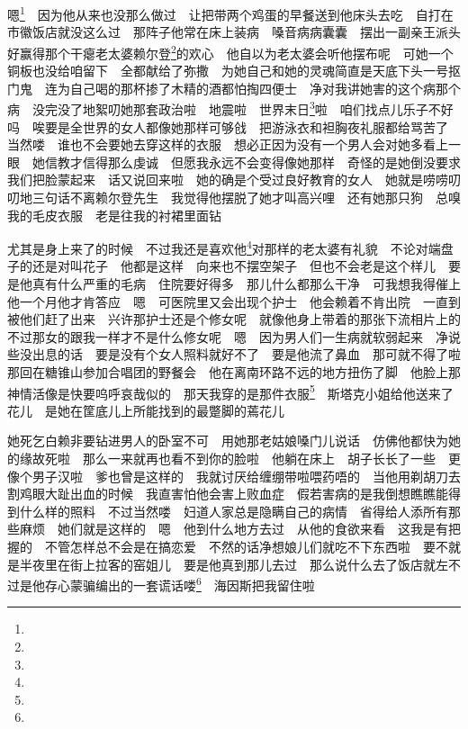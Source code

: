 \par 嗯\footnote{}　因为他从来也没那么做过　让把带两个鸡蛋的早餐送到他床头去吃　自打在市徽饭店就没这么过　那阵子他常在床上装病　嗓音病病囊囊　摆出一副亲王派头　好赢得那个干瘪老太婆赖尔登\footnote{}的欢心　他自以为老太婆会听他摆布呢　可她一个铜板也没给咱留下　全都献给了弥撒　为她自己和她的灵魂简直是天底下头一号抠门鬼　连为自己喝的那杯掺了木精的酒都怕掏四便士　净对我讲她害的这个病那个病　没完没了地絮叨她那套政治啦　地震啦　世界末日\footnote{}啦　咱们找点儿乐子不好吗　唉要是全世界的女人都像她那样可够戗　把游泳衣和袒胸夜礼服都给骂苦了　当然喽　谁也不会要她去穿这样的衣服　想必正因为没有一个男人会对她多看上一眼　她信教才信得那么虔诚　但愿我永远不会变得像她那样　奇怪的是她倒没要求我们把脸蒙起来　话又说回来啦　她的确是个受过良好教育的女人　她就是唠唠叨叨地三句话不离赖尔登先生　我觉得他摆脱了她才叫高兴哩　还有她那只狗　总嗅我的毛皮衣服　老是往我的衬裙里面钻　
\par 尤其是身上来了的时候　不过我还是喜欢他\footnote{}对那样的老太婆有礼貌　不论对端盘子的还是对叫花子　他都是这样　向来也不摆空架子　但也不会老是这个样儿　要是他真有什么严重的毛病　住院要好得多　那儿什么都那么干净　可我想我得催上他一个月他才肯答应　嗯　可医院里又会出现个护士　他会赖着不肯出院　一直到被他们赶了出来　兴许那护士还是个修女呢　就像他身上带着的那张下流相片上的　不过那女的跟我一样才不是什么修女呢　嗯　因为男人们一生病就软弱起来　净说些没出息的话　要是没有个女人照料就好不了　要是他流了鼻血　那可就不得了啦　那回在糖锥山参加合唱团的野餐会　他在离南环路不远的地方扭伤了脚　他脸上那神情活像是快要呜呼哀哉似的　那天我穿的是那件衣服\footnote{}　斯塔克小姐给他送来了花儿　是她在筐底儿上所能找到的最蹩脚的蔫花儿　
\par 她死乞白赖非要钻进男人的卧室不可　用她那老姑娘嗓门儿说话　仿佛他都快为她的缘故死啦　那么一来就再也看不到你的脸啦　他躺在床上　胡子长长了一些　更像个男子汉啦　爹也曾是这样的　我就讨厌给缠绷带啦喂药唔的　当他用剃胡刀去割鸡眼大趾出血的时候　我直害怕他会害上败血症　假若害病的是我倒想瞧瞧能得到什么样的照料　不过当然喽　妇道人家总是隐瞒自己的病情　省得给人添所有那些麻烦　她们就是这样的　嗯　他到什么地方去过　从他的食欲来看　这我是有把握的　不管怎样总不会是在搞恋爱　不然的话净想娘儿们就吃不下东西啦　要不就是半夜里在街上拉客的窑姐儿　要是他真到那儿去过　那么说什么去了饭店就左不过是他存心蒙骗编出的一套谎话喽\footnote{}　海因斯把我留住啦　
